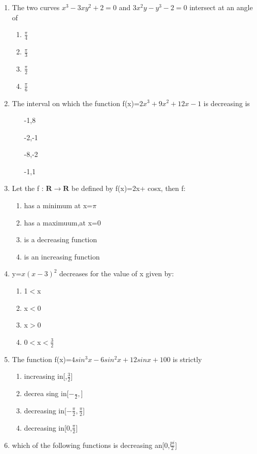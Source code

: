 \documentclass[12pt]{article}
\let\vec\mathbf
\begin{document}
\begin{enumerate}
\item The two curves $x^3-3xy^2+2=0$ and $3x^2y-y^3-2=0$ intersect at an angle of
\begin{enumerate}
\item $\frac{\pi}{4}$
\item $\frac{\pi}{3}$
\item $\frac{\pi}{2}$
\item $\frac{\pi}{6}$
\end{enumerate}
\item The interval on which the function f(x)=$2x^3+9x^2+12x-1$ is decreasing is
\begin{enumerate}
\item [-1,8]
\item [-2,-1]
\item [-8,-2]
\item [-1,1]
\end{enumerate}
\item Let the f : $\vec{R}\rightarrow \vec{R}$ be defined by f(x)=2x+ cosx, then f:
\begin{enumerate}
\item has a minimum at x=$\pi$
\item has a maximuum,at x=0
\item is a decreasing function 
\item is an increasing function
\end{enumerate}
\item y=$x(x-3)^2$ decreases for the value of x given by:
\begin{enumerate}
\item 1$<$x
\item x$<$0
\item x$>$0
\item 0$<$x$<$$\frac{3}{2}$
\end{enumerate}
\item The function f(x)=$4sin^3x-6 sin^2x+ 12 sinx+100$ is strictly
\begin{enumerate}
\item increasing in[,$\frac{3}{2}$]
\item decrea sing in[$-\frac{}{2},$]
\item decreasing in[$-\frac{\pi}{2},\frac{\pi}{2}$]
\item decreasing in[0,$\frac{\pi}{2}$]
\end{enumerate}
\item which of the following functions is decreasing an[0,$\frac{pi}{2}$]
\begin{enumerate}

\end{enumerate}
\end{enumerate}
\end{document}
